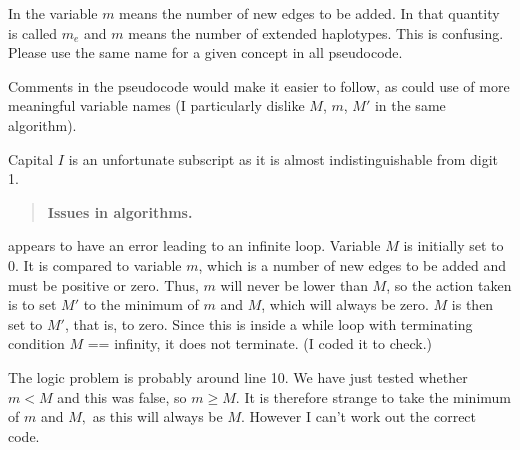 
\begin{point}{} %
In  the variable $m$ means the number of new edges to be
added. In  that quantity is called $m_e$ and $m$ means the
number of extended haplotypes. This is confusing. Please use the
same name for a given concept in all pseudocode.
\end{point}


\begin{point}{} %
Comments in the pseudocode would make it easier to follow, as could
use of more meaningful variable names (I particularly dislike $M$, $m$, $M'$
in the same algorithm).
\end{point}


\begin{point}{}
Capital $I$ is an unfortunate subscript as it is almost indistinguishable
from digit 1.
\end{point}


\begin{quote} %
\textbf{Issues in algorithms.}
\end{quote}

\begin{point}{}
 appears to have an error leading to an infinite
loop. Variable $M$ is initially set to 0. It is compared to variable $m$,
which is a number of new edges to be added and must be positive or zero.
Thus, $m$ will never be lower than $M$, so the action taken is to set $M'$ to
the minimum of $m$ and $M$, which will always be zero. $M$ is then set to
$M'$, that is, to zero. Since this is inside a while loop with terminating
condition $M$ == infinity, it does not terminate. (I coded it to check.)

The logic problem is probably around line 10. We have just tested
whether $m < M$ and this was false, so $m \ge M$. It is therefore
strange to take the minimum of $m$ and $M,$ as this will always be
$M$. However I can't work out the correct code.
\end{point}

